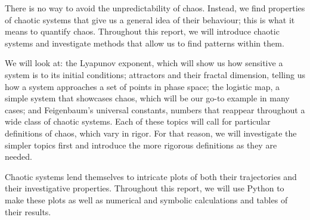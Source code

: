 There is no way to avoid the unpredictability of chaos. Instead, we find properties of chaotic systems that give us a general idea of their behaviour; this is what it means to quantify chaos. Throughout this report, we will introduce chaotic systems and investigate methods that allow us to find patterns within them. 

We will look at: the Lyapunov exponent, which will show us how sensitive a system is to its initial conditions; attractors and their fractal dimension, telling us how a system approaches a set of points in phase space; the logistic map, a simple system that showcases chaos, which will be our go-to example in many cases; and Feigenbaum's universal constants, numbers that reappear throughout a wide class of chaotic systems. Each of these topics will call for particular definitions of chaos, which vary in rigor. For that reason, we will investigate the simpler topics first and introduce the more rigorous definitions as they are needed.

Chaotic systems lend themselves to intricate plots of both their trajectories and their investigative properties. Throughout this report, we will use Python to make these plots as well as numerical and symbolic calculations and tables of their results. 

